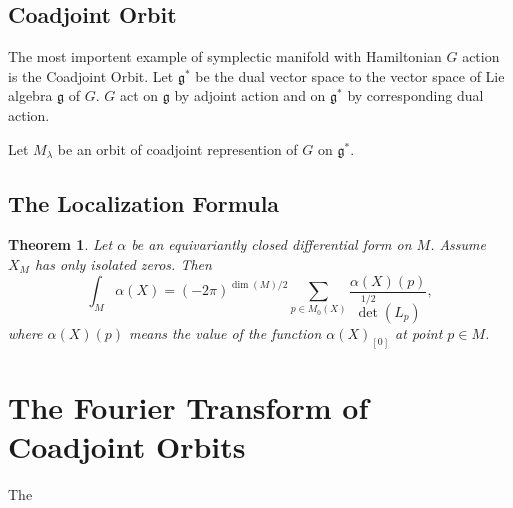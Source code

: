 \documentclass[11pt]{amsart}
\newtheorem{Thm}{Theorem}
\def\fgg{{\mathfrak{g}}}
\begin{document}
\subsection{Coadjoint Orbit}
The most importent example of symplectic manifold with Hamiltonian $G$
action is the Coadjoint Orbit. 
Let $\fgg^*$ be the dual vector space to the vector space of Lie
algebra $\fgg$ of $G$. $G$ act on $\fgg$ by adjoint action and on
$\fgg^*$ by corresponding dual action.

Let $M_\lambda$ be an orbit of coadjoint represention of $G$ on $\fgg^*$.

\subsection{The Localization Formula}

\begin{Thm} Let $\alpha$ be an equivariantly closed differential form
  on $M$. Assume $X_M$ has only isolated zeros. Then
\[
\int_M \alpha(X) = (-2\pi)^{\dim(M)/2}\sum_{p\in M_0(X)}\frac{\alpha(X)(p)}{\det^{1/2}(L_p)},
\]
where $\alpha(X)(p)$ means the value of the function $\alpha(X)_{[0]}$
at point $p\in M$.
\end{Thm}

\section{The Fourier Transform of Coadjoint Orbits}
The 
\end{document}
